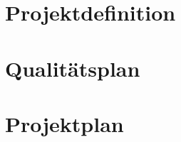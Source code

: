 \documentclass[a4paper,13pt]{scrreprt}
\begin{document}
\tableofcontents

\chapter{Projektdefinition}


\chapter{Qualitätsplan}


\chapter{Projektplan}

\end{document}
